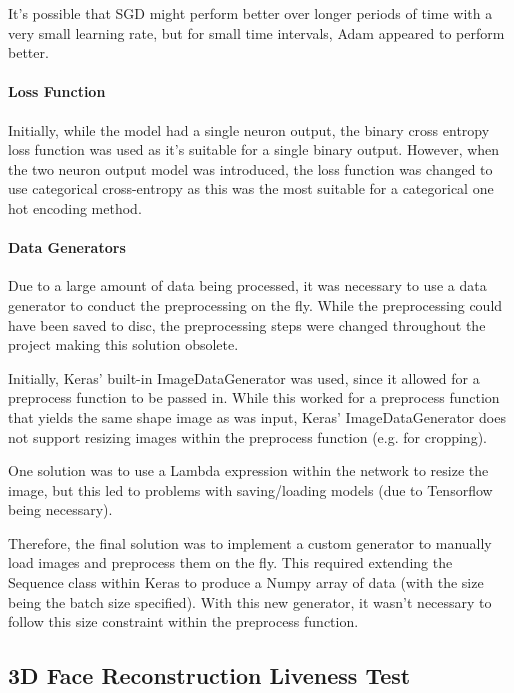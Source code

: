 \documentclass[12pt,a4paper]{article}
\begin{document}
                It's possible that SGD might perform better over longer periods of time with a very small learning rate, but for small time intervals, Adam appeared to perform better.


                \paragraph{Loss Function}
                Initially, while the model had a single neuron output, the binary cross entropy loss function was used as it's suitable for a single binary output.
                However, when the two neuron output model was introduced, the loss function was changed to use categorical cross-entropy as this was the most suitable
                for a categorical one hot encoding method.

                \paragraph{Data Generators}
                Due to a large amount of data being processed, it was necessary to use a data generator to conduct the preprocessing on the fly. While the preprocessing could have been saved to disc, the preprocessing steps were changed throughout the project making this solution obsolete.

                Initially, Keras' built-in ImageDataGenerator was used, since it allowed for a preprocess function to be passed in. While this worked for a preprocess function that yields the same shape image
                as was input, Keras' ImageDataGenerator does not support resizing images within the preprocess function (e.g. for cropping).

                One solution was to use a Lambda expression within the network to resize the image, but this led to problems with saving/loading models (due to Tensorflow being necessary).

                Therefore, the final solution was to implement a custom generator to manually load images and preprocess them on the fly. This required extending the Sequence class within Keras to produce a Numpy array of data (with the size being the batch size specified). With this new generator, it wasn't necessary to follow this size constraint within the preprocess function. 


    \subsection{3D Face Reconstruction Liveness Test}
\end{document}
